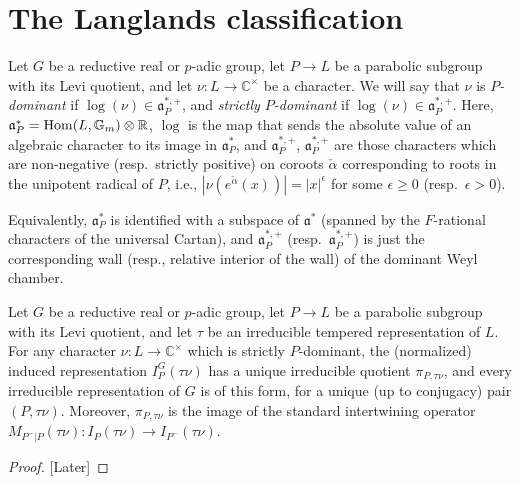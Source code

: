 \section{The Langlands classification}
\label{section-Langlands-classification}

\begin{definition}
 \label{definition-P-dominant}
 Let $G$ be a reductive real or $p$-adic group, let $P\to L$ be a parabolic subgroup with its Levi quotient, and let $\nu:L \to \mathbb C^\times$ be a character. We will say that $\nu$ is {\it $P$-dominant} if $\log(\nu)\in \mathfrak a_P^{*,+}$, and {\it strictly $P$-dominant} if $\log(\nu)\in \mathfrak a_P^{*,+}$. Here, $\mathfrak a_P^* = \mathop{\rm Hom}\nolimits(L, \mathbb G_m) \otimes \mathbb R$, $\log$ is the map that sends the absolute value of an algebraic character to its image in $\mathfrak a_P^*$, and $\mathfrak a_P^{*,+}$, $\mathfrak a_P^{*,+}$ are those characters which are non-negative (resp.\ strictly positive) on coroots $\check \alpha$ corresponding to roots in the unipotent radical of $P$, i.e., $|\nu(e^{\check\alpha}(x))| = |x|^\epsilon$ for some $\epsilon \ge 0$ (resp.\ $\epsilon >0$). 
\end{definition}

Equivalently, $\mathfrak a_P^*$ is identified with a subspace of $\mathfrak a^*$ (spanned by the $F$-rational characters of the universal Cartan), and $\mathfrak a_P^{*,+}$ (resp.\ $\mathfrak a_P^{*,+}$) is just the corresponding wall (resp., relative interior of the wall) of the dominant Weyl chamber.


\begin{theorem}
 \label{theorem-Langlands-quotient}
Let $G$ be a reductive real or $p$-adic group, let $P\to L$ be a parabolic subgroup with its Levi quotient, and let $\tau$ be an irreducible tempered representation of $L$. For any character $\nu:L \to \mathbb C^\times$ which is strictly $P$-dominant, the (normalized) induced representation $I_P^G(\tau\nu)$ has a unique irreducible quotient $\pi_{P,\tau\nu}$, and every irreducible representation of $G$ is of this form, for a unique (up to conjugacy) pair $(P, \tau\nu)$. Moreover, $\pi_{P,\tau\nu}$ is the image of the standard intertwining operator $M_{P^-|P}(\tau\nu): I_P(\tau\nu)\to I_{P^-}(\tau\nu)$. 
\end{theorem}

\begin{proof}

 [Later]
\end{proof}

